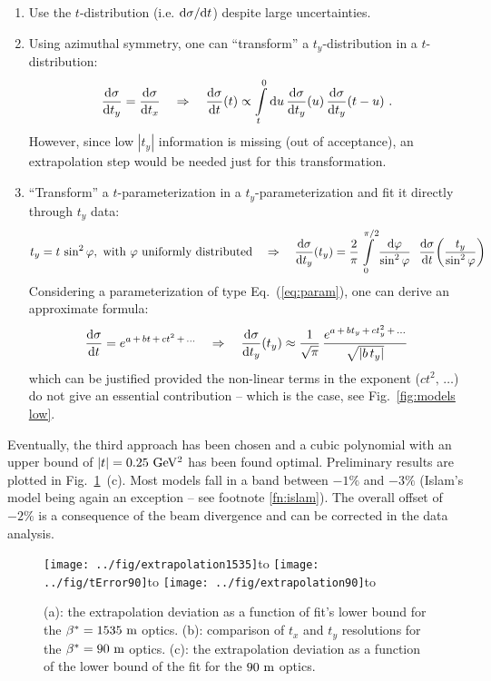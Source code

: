 \documentclass{desyproc}
\def\be{\beta}
\def\ph{\varphi}
\def\si{\sigma}
\def\un#1{\ {\rm #1}}
\def\subtitle#1#2{\vbox{\setbox0\hbox{#1}\copy0\hbox to\wd0{\hss#2\hss}}}
\def\d{{\rm d}}
\begin{document}
\begin{enumerate}
\item Use the $t$-distribution (i.e. $\d\si/\d t$) despite large uncertainties.

\item Using azimuthal symmetry, one can ``transform'' a $t_y$-distribution in a $t$-distribution:
$${\d\si\over\d t_y} = {\d\si\over\d t_x} \quad \Rightarrow \quad {\d\si\over\d t}(t) \propto \int\limits_t^0 \d u\, {\d\si\over\d t_y}(u)\, {\d\si\over\d t_y}(t - u)\ .$$
However, since low $|t_y|$ information is missing (out of acceptance), an extrapolation step would be needed just for this transformation.

\item ``Transform'' a $t$-parameterization in a $t_y$-parameterization and fit it directly through $t_y$ data:
$$t_y = t\,\sin^2\ph, \hbox{ with }\ph\hbox{ uniformly distributed} \quad \Rightarrow \quad {\d\si\over\d t_y}(t_y) = {2\over\pi} \int\limits_{0}^{\pi/2} {\d\ph\over\sin^2\ph}\ \ {\d\si\over\d t}\!\left(t_y\over\sin^2\ph\right)$$
Considering a parameterization of type Eq.~(\ref{eq:param}), one can derive an approximate formula:
$${\d\si\over\d t} = e^{a\, +\, bt\, +\, ct^2\, +\, \ldots} \quad\Rightarrow\quad {\d\si\over\d t_y}(t_y) \approx {1\over\sqrt{\pi}}\, {e^{a\, +\, bt_y\, +\, ct_y^2\, +\, \ldots}\over\sqrt{|b\,t_y|}}$$
which can be justified provided the non-linear terms in the exponent ($ct^2,\, \ldots$) do not give an essential contribution -- which is the case, see Fig.~\ref{fig:models low}.
\end{enumerate}

	
Eventually, the third approach has been chosen and a cubic polynomial with an upper bound of $|t| = 0.25\un{GeV^2}$ has been found optimal. Preliminary results are plotted in Fig.~\ref{fig:extrapol}~(c). Most models fall in a band between $-1\%$ and $-3\%$ (Islam's model being again an exception -- see footnote \ref{fn:islam}). The overall offset of $-2\%$ is a consequence of the beam divergence and can be corrected in the data analysis.

\begin{figure}[htb]
\centerline{\hss
	\subtitle{\texttt{[image: ../fig/extrapolation1535]}}{(a)}\hfil
	\subtitle{\texttt{[image: ../fig/tError90]}}{(b)}\hfil
	\subtitle{\texttt{[image: ../fig/extrapolation90]}}{(c)}\hss
}%
\caption{(a): the extrapolation deviation as a function of fit's lower bound for the $\be^* = 1535\un{m}$ optics.
(b): comparison of $t_x$ and $t_y$ resolutions for the $\be^* = 90\un{m}$ optics.
(c): the extrapolation deviation as a function of the lower bound of the fit for the $90\un{m}$ optics.
}%
\label{fig:extrapol}%
\end{figure}
\end{document}
